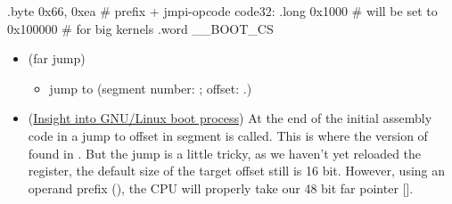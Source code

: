 \begin{itemize}
\begin{enumerate}
\begin{gascode}
        .byte 0x66, 0xea   # prefix + jmpi-opcode
code32: .long   0x1000     # will be set to 0x100000
                           # for big kernels
        .word   __BOOT_CS
      \end{gascode}
\begin{itemize}
\item {} (far jump)
  \begin{itemize}
  \item jump to  (segment number: ; offset: .)
  \end{itemize}
\item
  (\href{http://unixbhaskar.blogspot.com/2010/03/insight-into-gnulinux-boot-process.html}{Insight
    into GNU/Linux boot process}) At the end of the initial assembly code in
   a jump to offset  in segment
   is called. This is where the version of  found in
  . But the jump is a little tricky, as we haven’t
  yet reloaded the  register, the default size of the target offset still is 16
  bit. However, using an operand prefix (), the CPU will properly take our 48
  bit far pointer [].
\end{itemize}
  \end{enumerate}
\end{itemize}




